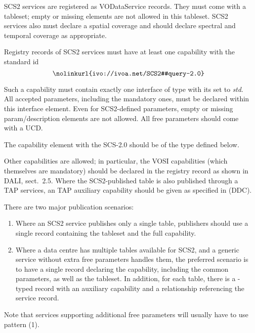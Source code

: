 \documentclass[11pt,a4paper]{ivoa}
\begin{document}
SCS2 services are registered as VODataService
\citep{2021ivoa.spec.1102D}  records.  They must come
with a tableset; empty or missing  elements are
not allowed in this tableset.  SCS2 services also must declare a spatial
coverage and should declare spectral and temporal coverage as
appropriate.

Registry records of SCS2 services must have at least one capability with
the standard id
$$
\hbox{\nolinkurl{ivo://ivoa.net/SCS2#query-2.0}}
$$

Such a capability must contain exactly one interface of type
 with its  set to \emph{std}.  All
accepted parameters, including the mandatory ones, must be declared
within this interface element.  Even for SCS2-defined parameters, empty
or missing param/description elements are not allowed.  All free
parameters should come with a UCD.

The capability element with the SCS-2.0  should be of
the type  defined below.

Other capabilities are allowed; in particular, the VOSI capabilities
(which themselves are mandatory) should be declared in the registry
record as shown in DALI, sect.~2.5.  Where the SCS2-published table is
also published through a TAP services, an TAP auxiliary capability
should be given as specified in \citet{2019ivoa.spec.0520D} (DDC).

There are two major publication scenarios:

\begin{enumerate}
\item Where an SCS2 service publishes only a single table, publishers
should use a single  record containing the
tableset and the full capability.

\item Where a data centre has multiple tables available for SCS2, and a
generic service without extra free parameters handles them, the
preferred scenario is to have a single  record
declaring the capability, including the common parameters, as well as
the tableset.  In addition, for each table, there is a
-typed record with an auxiliary capability and
a relationship referencing the service record.

\end{enumerate}

Note that services supporting additional free parameters will usually
have to use pattern (1).
\end{document}
